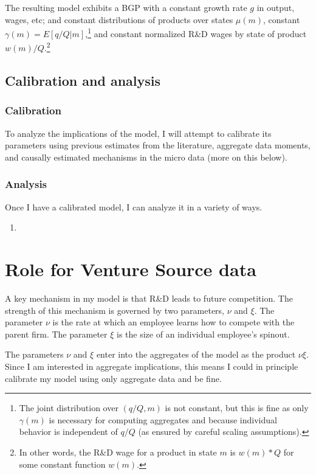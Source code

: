 \documentclass[12pt,english]{article}
\theoremstyle{remark}
\begin{document}
The resulting model exhibits a BGP with a constant growth rate $g$ in output, wages, etc; and constant distributions of products over states $\mu(m)$, constant $\gamma(m) = E[q / Q | m]$,\footnote{The joint distribution over $(q/Q,m)$ is not constant, but this is fine as only $\gamma(m)$ is necessary for computing aggregates and because individual behavior is independent of $q / Q$ (as ensured by careful scaling assumptions).} and constant normalized R\&D wages by state of product $w(m) / Q$.\footnote{In other words, the R\&D wage for a product in state $m$ is $w(m) * Q$ for some constant function $w(m)$.} 

\subsection{Calibration and analysis}


\subsubsection{Calibration}

To analyze the implications of the model, I will attempt to calibrate its parameters using previous estimates from the literature, aggregate data moments, and causally estimated mechanisms in the micro data (more on this below).

\subsubsection{Analysis} 

Once I have a calibrated model, I can analyze it in a variety of ways. 
\begin{enumerate}
	\item 
\end{enumerate}


\section{Role for Venture Source data}

A key mechanism in my model is that R\&D leads to future competition. The strength of this mechanism is governed by two parameters, $\nu$ and $\xi$. The parameter $\nu$ is the rate at which an employee learns how to compete with the parent firm. The parameter $\xi$ is the size of an individual employee's spinout. 

The parameters $\nu$ and $\xi$ enter into the aggregates of the model as the product $\nu \xi$. Since I am interested in aggregate implications, this means I could in principle calibrate my model using only aggregate data and be fine.  
\end{document}
